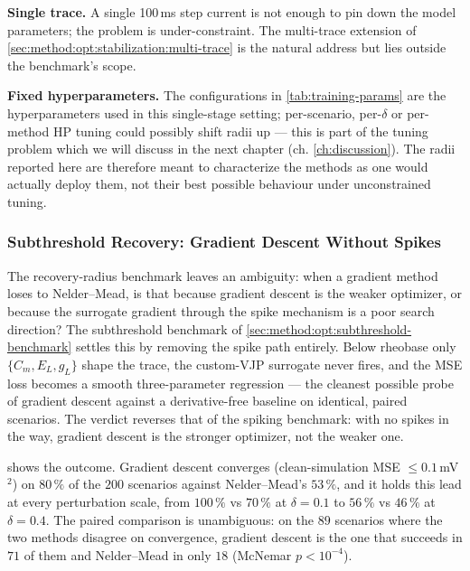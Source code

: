 \textbf{Single trace.} A single 100\,ms step current is not enough to pin down the model parameters;
the problem is under-constraint.
The multi-trace extension of \cref{sec:method:opt:stabilization:multi-trace} is the natural address but lies outside the benchmark's scope.

\textbf{Fixed hyperparameters.} The configurations in \cref{tab:training-params} are the hyperparameters used in this single-stage setting;
per-scenario, per-$\delta$ or per-method HP tuning could possibly shift radii up --- this is part of the tuning problem which we will discuss in the next chapter (ch. \ref{ch:discussion}).
The radii reported here are therefore meant to characterize the methods as one would actually deploy them, not their best possible behaviour under unconstrained tuning.

\subsubsection{Subthreshold Recovery: Gradient Descent Without Spikes}\label{sec:results:subthreshold}
The recovery-radius benchmark leaves an ambiguity: when a gradient method loses to Nelder--Mead, is that because gradient descent is the weaker optimizer, or because the surrogate gradient through the spike mechanism is a poor search direction?
The subthreshold benchmark of \cref{sec:method:opt:subthreshold-benchmark} settles this by removing the spike path entirely.
Below rheobase only $\{C_m, E_L, g_L\}$ shape the trace, the custom-VJP surrogate never fires, and the \gls{MSE} loss becomes a smooth three-parameter regression --- the cleanest possible probe of gradient descent against a derivative-free baseline on identical, paired scenarios.
The verdict reverses that of the spiking benchmark: with no spikes in the way, gradient descent is the stronger optimizer, not the weaker one.

 shows the outcome.
Gradient descent converges (clean-simulation \gls{MSE} $\leq 0.1$\,mV$^2$) on $80\,\%$ of the $200$ scenarios against Nelder--Mead's $53\,\%$, and it holds this lead at every perturbation scale, from $100\,\%$ vs $70\,\%$ at $\delta = 0.1$ to $56\,\%$ vs $46\,\%$ at $\delta = 0.4$.
The paired comparison is unambiguous: on the $89$ scenarios where the two methods disagree on convergence, gradient descent is the one that succeeds in $71$ of them and Nelder--Mead in only $18$ (McNemar $p < 10^{-4}$).


